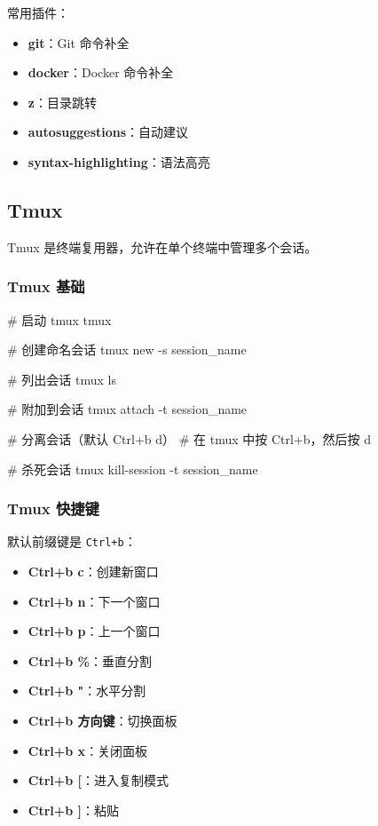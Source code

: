 
常用插件：

\begin{itemize}
  \item \textbf{git}：Git 命令补全
  \item \textbf{docker}：Docker 命令补全
  \item \textbf{z}：目录跳转
  \item \textbf{autosuggestions}：自动建议
  \item \textbf{syntax-highlighting}：语法高亮
\end{itemize}

\subsection{Tmux}

Tmux 是终端复用器，允许在单个终端中管理多个会话。

\subsubsection{Tmux 基础}


\begin{lstcode}[numbers=none]
  # 启动 tmux
  tmux

  # 创建命名会话
  tmux new -s session_name

  # 列出会话
  tmux ls

  # 附加到会话
  tmux attach -t session_name

  # 分离会话（默认 Ctrl+b d）
  # 在 tmux 中按 Ctrl+b，然后按 d

  # 杀死会话
  tmux kill-session -t session_name
\end{lstcode}

\subsubsection{Tmux 快捷键}

默认前缀键是 \lstinline{Ctrl+b}：

\begin{itemize}
  \item \textbf{Ctrl+b c}：创建新窗口
  \item \textbf{Ctrl+b n}：下一个窗口
  \item \textbf{Ctrl+b p}：上一个窗口
  \item \textbf{Ctrl+b \%}：垂直分割
  \item \textbf{Ctrl+b "}：水平分割
  \item \textbf{Ctrl+b 方向键}：切换面板
  \item \textbf{Ctrl+b x}：关闭面板
  \item \textbf{Ctrl+b [}：进入复制模式
  \item \textbf{Ctrl+b ]}：粘贴
\end{itemize}


